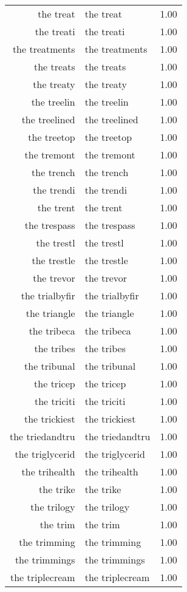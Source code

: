 \begin{table}[ht]
\begin{tabular}{rlr}
  the treat & the treat & 1.00 \\ 
  the treati & the treati & 1.00 \\ 
  the treatments & the treatments & 1.00 \\ 
  the treats & the treats & 1.00 \\ 
  the treaty & the treaty & 1.00 \\ 
  the treelin & the treelin & 1.00 \\ 
  the treelined & the treelined & 1.00 \\ 
  the treetop & the treetop & 1.00 \\ 
  the tremont & the tremont & 1.00 \\ 
  the trench & the trench & 1.00 \\ 
  the trendi & the trendi & 1.00 \\ 
  the trent & the trent & 1.00 \\ 
  the trespass & the trespass & 1.00 \\ 
  the trestl & the trestl & 1.00 \\ 
  the trestle & the trestle & 1.00 \\ 
  the trevor & the trevor & 1.00 \\ 
  the trialbyfir & the trialbyfir & 1.00 \\ 
  the triangle & the triangle & 1.00 \\ 
  the tribeca & the tribeca & 1.00 \\ 
  the tribes & the tribes & 1.00 \\ 
  the tribunal & the tribunal & 1.00 \\ 
  the tricep & the tricep & 1.00 \\ 
  the triciti & the triciti & 1.00 \\ 
  the trickiest & the trickiest & 1.00 \\ 
  the triedandtru & the triedandtru & 1.00 \\ 
  the triglycerid & the triglycerid & 1.00 \\ 
  the trihealth & the trihealth & 1.00 \\ 
  the trike & the trike & 1.00 \\ 
  the trilogy & the trilogy & 1.00 \\ 
  the trim & the trim & 1.00 \\ 
  the trimming & the trimming & 1.00 \\ 
  the trimmings & the trimmings & 1.00 \\ 
  the triplecream & the triplecream & 1.00 \\ 

\end{tabular}
\end{table}
